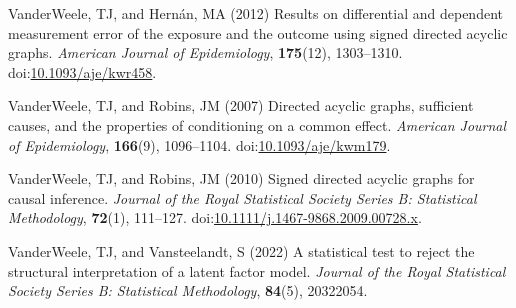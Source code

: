 \documentclass[
  singlecolumn,
  9pt]{article}
\newlength{\cslhangindent}
\newenvironment{CSLReferences}[2] %
 {\begin{list}{}{%
  \setlength{\itemindent}{0pt}
  \setlength{\leftmargin}{0pt}
  \setlength{\parsep}{0pt}
  \ifodd #1
   \setlength{\leftmargin}{\cslhangindent}
   \setlength{\itemindent}{-1\cslhangindent}
  \fi
  \setlength{\itemsep}{#2\baselineskip}}}
 {\end{list}}
\begin{document}
\begin{CSLReferences}{1}{0}
VanderWeele, TJ, and Hernán, MA (2012) Results on differential and
dependent measurement error of the exposure and the outcome using signed
directed acyclic graphs. \emph{American Journal of Epidemiology},
\textbf{175}(12), 1303--1310.
doi:\href{https://doi.org/10.1093/aje/kwr458}{10.1093/aje/kwr458}.

VanderWeele, TJ, and Robins, JM (2007) Directed acyclic graphs,
sufficient causes, and the properties of conditioning on a common
effect. \emph{American Journal of Epidemiology}, \textbf{166}(9),
1096--1104.
doi:\href{https://doi.org/10.1093/aje/kwm179}{10.1093/aje/kwm179}.

VanderWeele, TJ, and Robins, JM (2010) Signed directed acyclic graphs
for causal inference. \emph{Journal of the Royal Statistical Society
Series B: Statistical Methodology}, \textbf{72}(1), 111--127.
doi:\href{https://doi.org/10.1111/j.1467-9868.2009.00728.x}{10.1111/j.1467-9868.2009.00728.x}.

VanderWeele, TJ, and Vansteelandt, S (2022) A statistical test to reject
the structural interpretation of a latent factor model. \emph{Journal of
the Royal Statistical Society Series B: Statistical Methodology},
\textbf{84}(5), 20322054.

\end{CSLReferences}
\end{document}
